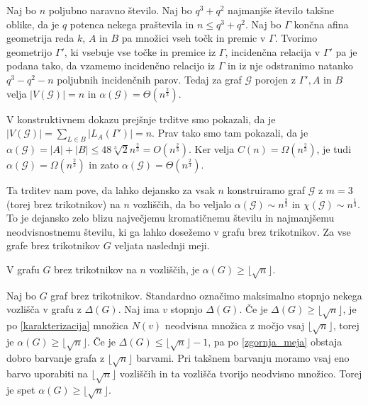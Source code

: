 \documentclass[mat1, tisk]{fmfdelo}
\begin{document}
    \begin{trditev}
        Naj bo $n$ poljubno naravno število. Naj bo $q^3 + q^2$ najmanjše število takšne oblike, da je $q$ potenca nekega praštevila in $n \leq q^3 + q^2$. Naj bo $\Gamma$ končna afina geometrija reda $k$, $A$ in $B$ pa množici vseh točk in premic v $\Gamma$. Tvorimo geometrijo $\Gamma'$,
        ki vsebuje vse točke in premice iz $\Gamma$, incidenčna relacija v $\Gamma'$ pa je podana tako, da vzamemo incidenčno relacijo iz $\Gamma$ in iz nje odstranimo natanko $q^3 - q^2 - n$ poljubnih incidenčnih parov. Tedaj za graf $\mathcal{G}$ porojen z $\Gamma', A$ in $B$ velja $|V(\mathcal{G})| = n$ in $\alpha(\mathcal{G}) = \Theta(n^{\frac{2}{3}})$. 
    \end{trditev}

    \begin{dokaz}
        V konstruktivnem dokazu prejšnje trditve smo pokazali, da je $|V(\mathcal{G})| = \sum_{L \in B}|L_A(\Gamma')| = n$. Prav tako smo tam pokazali, da je $\alpha(\mathcal{G}) = |A| + |B| \leq 48\sqrt[3]{2}n^{\frac{2}{3}} = O(n^{\frac{2}{3}})$. Ker velja $C(n) = \Omega(n^{\frac{2}{3}})$, je tudi $\alpha(\mathcal{G}) = \Omega(n^{\frac{2}{3}})$
        in zato $\alpha(\mathcal{G}) = \Theta(n^{\frac{2}{3}})$.
    \end{dokaz}

Ta trditev nam pove, da lahko dejansko za vsak $n$ konstruiramo graf $\mathcal{G}$ z $m = 3$ (torej brez trikotnikov) na $n$ vozliščih, da bo veljalo $\alpha(\mathcal{G}) \sim n^{\frac{2}{3}}$ in $\chi(\mathcal{G}) \sim n^{\frac{1}{3}}$. To je dejansko zelo blizu največjemu kromatičnemu številu in najmanjšemu neodvisnostnemu številu, 
ki ga lahko dosežemo v grafu brez trikotnikov. Za vse grafe brez trikotnikov $G$ veljata naslednji meji.

    \begin{trditev}
        V grafu $G$ brez trikotnikov na $n$ vozliščih, je $\alpha(G) \geq \lfloor\sqrt{n}\rfloor$.
    \end{trditev}

    \begin{dokaz}
        Naj bo $G$ graf brez trikotnikov. Standardno označimo maksimalno stopnjo nekega vozlišča v grafu z $\Delta(G)$. Naj ima $v$ stopnjo $\Delta(G)$. Če je $\Delta(G) \geq \lfloor\sqrt{n}\rfloor$, je po \ref{karakterizacija} množica $N(v)$ neodvisna množica z močjo vsaj 
        $\lfloor\sqrt{n}\rfloor$, torej je $\alpha(G) \geq \lfloor\sqrt{n}\rfloor$. Če je $\Delta(G) \leq \lfloor\sqrt{n}\rfloor - 1$, pa po \ref{zgornja_meja} obstaja dobro barvanje grafa z $\lfloor\sqrt{n}\rfloor$ barvami. Pri takšnem barvanju moramo vsaj eno barvo uporabiti
        na $\lfloor\sqrt{n}\rfloor$ vozliščih in ta vozlišča tvorijo neodvisno množico. Torej je spet $\alpha(G) \geq \lfloor\sqrt{n}\rfloor$.
    \end{dokaz}
\end{document}
